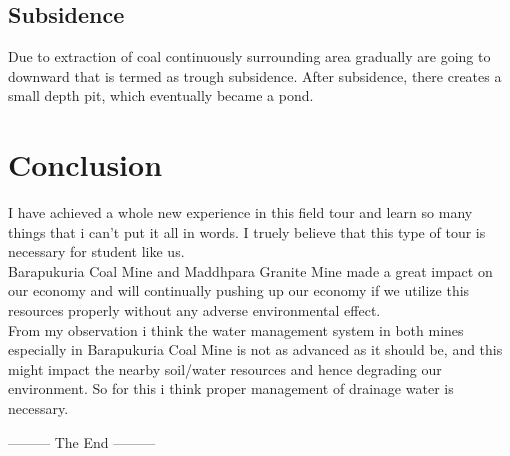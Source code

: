 \documentclass[12pt,a4paper]{article}
\begin{document}
\subsection{Subsidence}
Due to extraction of coal continuously surrounding area gradually are going to downward that is termed as trough subsidence. After subsidence, there creates a small depth pit, which eventually became a pond.



\section{Conclusion}
I have achieved a whole new experience in this field tour and learn so many things that i can't put it all in words. I truely believe that this type of tour is necessary for student like us.\\

\noindent
Barapukuria Coal Mine and Maddhpara Granite Mine made a great impact on our economy and will continually pushing up our economy if we utilize this resources properly without any adverse environmental effect.\\
From my observation i think the water management system in both mines especially  in Barapukuria Coal Mine is not as advanced as it should be, and this might impact the nearby soil/water resources and hence degrading our environment. So for this i think proper management of drainage water is necessary.



\vspace{50pt}
\begin{center}
\large{--------- The End ---------}
\end{center}
\end{document}
